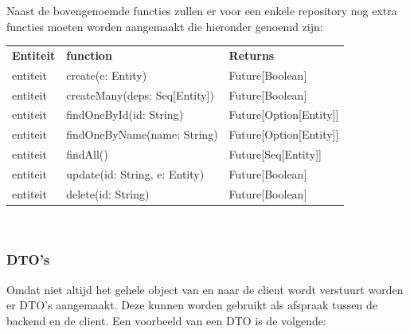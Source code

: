 Naast de bovengenoemde functies zullen er voor een enkele repository nog extra functies moeten worden aangemaakt die hieronder genoemd zijn:

\begin{tabular}{lll}
    \textbf{Entiteit} & \textbf{function} & \textbf{Returns}\\
    entiteit & create(e: Entity) & Future[Boolean] \\
    entiteit & createMany(deps: Seq[Entity])& Future[Boolean]\\
    entiteit & findOneById(id: String) & Future[Option[Entity]]\\
    entiteit & findOneByName(name: String) & Future[Option[Entity]]\\
    entiteit & findAll() & Future[Seq[Entity]] \\
    entiteit & update(id: String, e: Entity) & Future[Boolean]\\
    entiteit & delete(id: String) & Future[Boolean] \\
\end{tabular} \\




\subsubsection{DTO's}
Omdat niet altijd het gehele object van en naar de client wordt verstuurt worden er DTO's aangemaakt. Deze kunnen worden gebruikt als afspraak tussen de backend en de client. Een voorbeeld van een DTO is de volgende:

